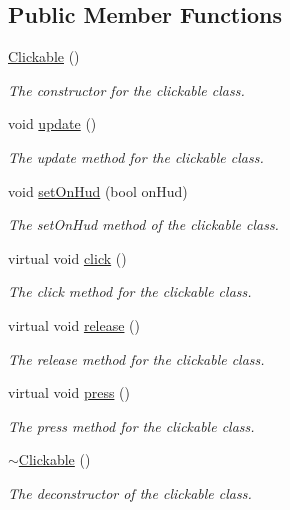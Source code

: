 \subsection*{Public Member Functions}
\begin{DoxyCompactItemize}
\item 
\hyperlink{class_clickable_a526e0a8373f069f85db6d0d8fc4ec655}{Clickable} ()
\begin{DoxyCompactList}\small\item\em The constructor for the clickable class. \end{DoxyCompactList}\item 
void \hyperlink{class_clickable_a57d5d78289d710b078ddfe61000f0dbd}{update} ()
\begin{DoxyCompactList}\small\item\em The update method for the clickable class. \end{DoxyCompactList}\item 
void \hyperlink{class_clickable_a28eaa099f0a3230d7a140a1690b64036}{set\+On\+Hud} (bool on\+Hud)
\begin{DoxyCompactList}\small\item\em The set\+On\+Hud method of the clickable class. \end{DoxyCompactList}\item 
virtual void \hyperlink{class_clickable_a1f99a456a892196f3fa9b6e380e7ac7a}{click} ()
\begin{DoxyCompactList}\small\item\em The click method for the clickable class. \end{DoxyCompactList}\item 
virtual void \hyperlink{class_clickable_a385ffbb3aae2b3528e183440b7ac37dc}{release} ()
\begin{DoxyCompactList}\small\item\em The release method for the clickable class. \end{DoxyCompactList}\item 
virtual void \hyperlink{class_clickable_a0bfd41ac944b05899a34a5ab3ed531c4}{press} ()
\begin{DoxyCompactList}\small\item\em The press method for the clickable class. \end{DoxyCompactList}\item 
\hyperlink{class_clickable_ac534e76857fc4ff6dc079b0185ee076c}{$\sim$\+Clickable} ()
\begin{DoxyCompactList}\small\item\em The deconstructor of the clickable class. \end{DoxyCompactList}\end{DoxyCompactItemize}
